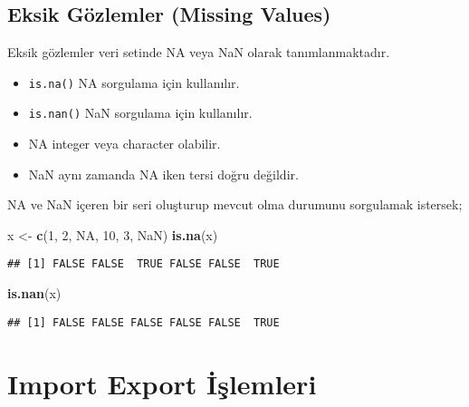 \documentclass[
]{book}
\newenvironment{Shaded}{\begin{snugshade}}{\end{snugshade}}
\newcommand{\DecValTok}[1]{\textcolor[rgb]{0.00,0.00,0.81}{#1}}
\newcommand{\KeywordTok}[1]{\textcolor[rgb]{0.13,0.29,0.53}{\textbf{#1}}}
\newcommand{\NormalTok}[1]{#1}
\newcommand{\OtherTok}[1]{\textcolor[rgb]{0.56,0.35,0.01}{#1}}
\newcommand{\StringTok}[1]{\textcolor[rgb]{0.31,0.60,0.02}{#1}}
\providecommand{\tightlist}{%
  \setlength{\itemsep}{0pt}\setlength{\parskip}{0pt}}
\begin{document}
\hypertarget{eksik-guxf6zlemler-missing-values}{%
\section{Eksik Gözlemler (Missing Values)}\label{eksik-guxf6zlemler-missing-values}}

Eksik gözlemler veri setinde NA veya NaN olarak tanımlanmaktadır.

\begin{itemize}
\tightlist
\item
  \texttt{is.na()} NA sorgulama için kullanılır.
\item
  \texttt{is.nan()} NaN sorgulama için kullanılır.
\item
  NA integer veya character olabilir.
\item
  NaN aynı zamanda NA iken tersi doğru değildir.
\end{itemize}

NA ve NaN içeren bir seri oluşturup mevcut olma durumunu sorgulamak istersek;

\begin{Shaded}
\begin{Highlighting}[]
\NormalTok{x <-}\StringTok{ }\KeywordTok{c}\NormalTok{(}\DecValTok{1}\NormalTok{, }\DecValTok{2}\NormalTok{, }\OtherTok{NA}\NormalTok{, }\DecValTok{10}\NormalTok{, }\DecValTok{3}\NormalTok{, }\OtherTok{NaN}\NormalTok{)}
\KeywordTok{is.na}\NormalTok{(x)}
\end{Highlighting}
\end{Shaded}

\begin{verbatim}
## [1] FALSE FALSE  TRUE FALSE FALSE  TRUE
\end{verbatim}

\begin{Shaded}
\begin{Highlighting}[]
\KeywordTok{is.nan}\NormalTok{(x)}
\end{Highlighting}
\end{Shaded}

\begin{verbatim}
## [1] FALSE FALSE FALSE FALSE FALSE  TRUE
\end{verbatim}

\hypertarget{import-export-iux15flemleri}{%
\chapter{Import Export İşlemleri}\label{import-export-iux15flemleri}}
\end{document}
